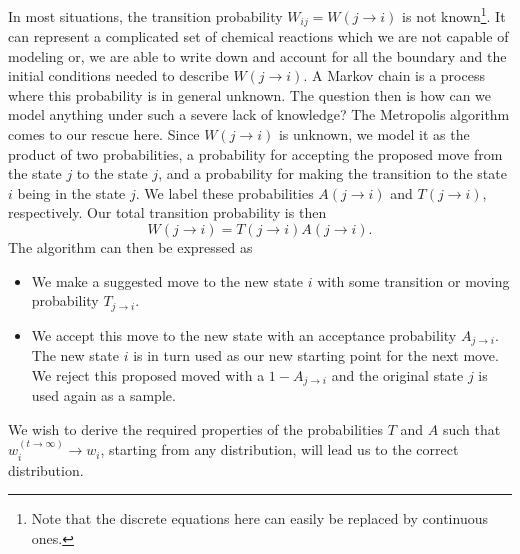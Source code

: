 In most situations, the transition probability $W_{ij}=W(j\rightarrow i)$ is not known\footnote{Note that the discrete equations here can easily be replaced by continuous ones.}. It can represent a complicated
set of chemical reactions which we are not capable of modeling or, we are able to  write down and account for 
all the boundary and the initial conditions
needed to describe $W(j\rightarrow i)$.   A Markov chain is a process where this probability is in general unknown.
The question then is how can we model anything under such a severe lack of knowledge? The Metropolis algorithm comes to our rescue here. Since $W(j\rightarrow i)$ is unknown, we model it as the product of two probabilities, 
a probability for accepting the proposed move from the state $j$ to the state $j$, and a probability for making the transition to the state $i$ being in the state $j$. We label these probabilities $A(j\rightarrow i)$ and $T(j\rightarrow i)$, respectively.  Our total transition probability is then 
\[
W(j\rightarrow i)=T(j\rightarrow i)A(j\rightarrow i).
\]
The algorithm can then be expressed as
\begin{itemize}
\item
We make a suggested move to the new state $i$ with some transition or moving probability $T_{j\rightarrow i}$.
\item
We accept this move to the new state with an acceptance probability $A_{j \rightarrow i}$. The new state $i$ is in turn
used as our new starting point for the next move.  We reject this proposed moved with a $1-A_{j\rightarrow i}$
and the original state $j$ is used again as a sample.
\end{itemize}
We wish to derive the required properties of the probabilities $T$ and $A$ such that
$w_i^{(t\rightarrow \infty)} \rightarrow w_i$, starting
from any distribution, will lead us to the correct distribution.

